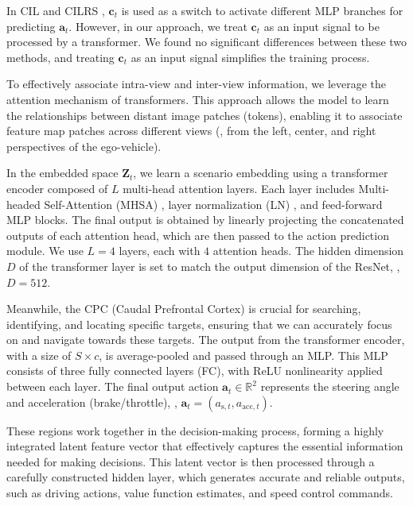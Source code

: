 In CIL \cite{Codevilla:2018} and CILRS \cite{Codevilla:2019}, $\mathbf{c}_{t}$ is used as a switch to activate different MLP branches for predicting $\mathbf{a}_{t}$. 
However, in our approach, we treat $\mathbf{c}_{t}$ as an input signal to be processed by a transformer. 
We found no significant differences between these two methods, and treating $\mathbf{c}_{t}$ as an input signal simplifies the training process.


To effectively associate intra-view and inter-view information, we leverage the attention mechanism of transformers\cite{Vaswani:2017}. 
This approach allows the model to learn the relationships between distant image patches (tokens), enabling it to associate feature map patches across different views ({\ie}, from the left, center, and right perspectives of the ego-vehicle). 


In the embedded space $\mathbf{Z}_{t}$, we learn a scenario embedding using a transformer encoder composed of $L$ multi-head attention layers. 
Each layer includes Multi-headed Self-Attention (MHSA) \cite{Vaswani:2017}, layer normalization (LN) \cite{Ba:2016}, and feed-forward MLP blocks.  
The final output is obtained by linearly projecting the concatenated outputs of each attention head, which are then passed to the action prediction module. 
We use $L=4$ layers, each with $4$ attention heads. 
The hidden dimension $D$ of the transformer layer is set to match the output dimension of the ResNet, {\ie}, $D=512$. 


Meanwhile, the CPC (Caudal Prefrontal Cortex) is crucial for searching, identifying, and locating specific targets, ensuring that we can accurately focus on and navigate towards these targets.  
The output from the transformer encoder, with a size of $S\times c$, is average-pooled and passed through an MLP.
This MLP consists of three fully connected layers (FC), with ReLU nonlinearity applied between each layer.
The final output action $\mathbf{a}_t\in\mathbb{R}^2$ represents the steering angle and acceleration (brake/throttle), {\ie}, $\mathbf{a}_{t} = (a_{\text{s},t}, a_{\text{acc}, t})$. 


These regions work together in the decision-making process, forming a highly integrated latent feature vector that effectively captures the essential information needed for making decisions. 
This latent vector is then processed through a carefully constructed hidden layer, which generates accurate and reliable outputs, such as driving actions, value function estimates, and speed control commands.



